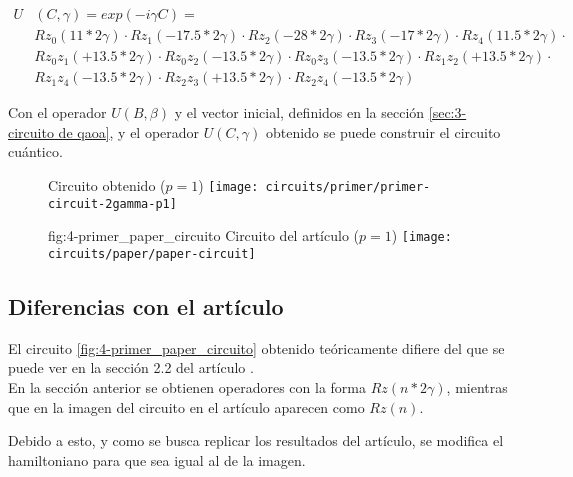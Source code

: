 \begin{align*}
  U&(C, \gamma) = exp(-i \gamma C) = &&\\
   &Rz_0(11*2\gamma) \cdot Rz_1(-17.5*2\gamma) \cdot Rz_2(-28*2\gamma) \cdot Rz_3(-17*2\gamma) \cdot Rz_4(11.5*2\gamma) \cdot \\
   &Rz_0z_1(+13.5 * 2\gamma) \cdot Rz_0z_2(-13.5 * 2\gamma) \cdot Rz_0z_3(-13.5 * 2\gamma) \cdot Rz_1z_2(+13.5 * 2\gamma) \cdot \\
   &Rz_1z_4(-13.5 * 2\gamma) \cdot Rz_2z_3(+13.5 * 2\gamma) \cdot Rz_2z_4(-13.5 * 2\gamma)
\end{align*}

Con el operador \(U(B, \beta)\) y el vector inicial, definidos en la sección \ref{sec:3-circuito de qaoa}, y el operador \(U(C, \gamma)\) obtenido se puede construir el circuito cuántico.

\begin{figure}[htbp]{}{ Circuito obtenido ($p=1$) }
  \centering
  \texttt{[image: circuits/primer/primer-circuit-2gamma-p1]}
\end{figure}

\begin{figure}[htbp]{fig:4-primer_paper_circuito}{ Circuito del artículo ($p=1$) }
  \centering
  \texttt{[image: circuits/paper/paper-circuit]}
\end{figure}

\subsection{Diferencias con el artículo}
\label{sec:4-primer grafo diferencias con el articulo}
El circuito \ref{fig:4-primer_paper_circuito} obtenido teóricamente difiere del que se puede ver en la sección 2.2 del artículo \cite{multi-objective_routing_optimization}. \\
En la sección anterior se obtienen operadores con la forma \(Rz(n*2\gamma)\), mientras que en la imagen del circuito en el artículo aparecen como \(Rz(n)\).

Debido a esto, y como se busca replicar los resultados del artículo, se modifica el hamiltoniano para que sea igual al de la imagen.


